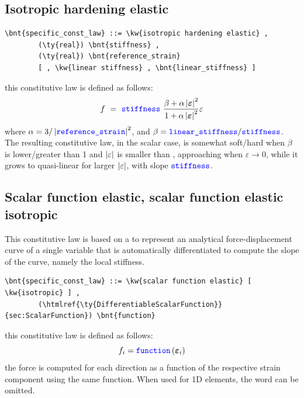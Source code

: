 \subsection{Isotropic hardening elastic}
\begin{Verbatim}[commandchars=\\\{\}]
    \bnt{specific_const_law} ::= \kw{isotropic hardening elastic} ,
        (\ty{real}) \bnt{stiffness} ,
        (\ty{real}) \bnt{reference_strain}
        [ , \kw{linear stiffness} , \bnt{linear_stiffness} ]
\end{Verbatim}
this constitutive law is defined as follows:
\begin{displaymath}
    f \ = \ \textcolor{blue}{\texttt{stiffness}} \ \frac{
        \beta + \alpha\left| \boldsymbol{\varepsilon} \right|^2
    }{
        1 + \alpha\left| \boldsymbol{\varepsilon} \right|^2
    }\varepsilon
\end{displaymath}
where $\alpha=3/\left| \textcolor{blue}{\texttt{reference\_strain}} \right|^2$,
and $\beta=\textcolor{blue}{\texttt{linear\_stiffness}}/\textcolor{blue}{\texttt{stiffness}}$.
The resulting constitutive law, in the scalar case,
is somewhat soft/hard when $\beta$ is lower/greater than 1
and $\left| \varepsilon \right|$ is smaller than ,
approaching  when $\varepsilon\rightarrow{0}$,
while it grows to quasi-linear for larger $\left| \varepsilon \right|$, 
with slope $\textcolor{blue}{\texttt{stiffness}}$.

\subsection{Scalar function elastic, scalar function elastic isotropic}
This constitutive law is based on a 
to represent an analytical force-displacement curve 
of a single variable that is automatically differentiated 
to compute the slope of the curve, namely the local stiffness.
\begin{Verbatim}[commandchars=\\\{\}]
    \bnt{specific_const_law} ::= \kw{scalar function elastic} [ \kw{isotropic} ] ,
        (\htmlref{\ty{DifferentiableScalarFunction}}{sec:ScalarFunction}) \bnt{function}
\end{Verbatim}
this constitutive law is defined as follows:
\begin{displaymath}
	f_i = \textcolor{blue}{\texttt{function}}\left( \boldsymbol{\varepsilon}_i \right)
\end{displaymath}
the force is computed for each direction as a function of the respective
strain component using the same function.
When used for 1D elements, the word  can be omitted.

